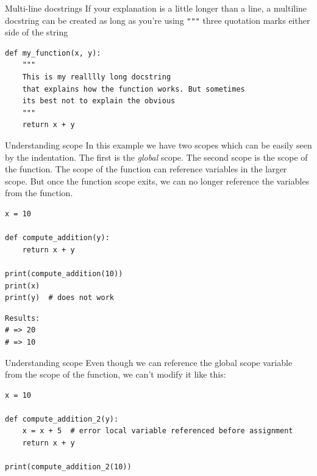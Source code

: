 \documentclass[10pt]{beamer}
\begin{document}
\begin{frame}[label={sec:org1e1bd2d},fragile]{Multi-line docstrings}
 If your explanation is a little longer than a line, a multiline docstring can be
created as long as you're using \texttt{"""} three quotation marks either side of the string

\begin{verbatim}
def my_function(x, y):
    """
    This is my realllly long docstring
    that explains how the function works. But sometimes
    its best not to explain the obvious
    """
    return x + y
\end{verbatim}
\end{frame}

\begin{frame}[label={sec:org802cd09},fragile]{Understanding scope}
 In this example we have two scopes which can be easily seen by the indentation. The
first is the \emph{global} scope. The second scope is the scope of the function. The scope
of the function can reference variables in the larger scope. But once the function
scope exits, we can no longer reference the variables from the function.

\begin{verbatim}
x = 10

def compute_addition(y):
    return x + y

print(compute_addition(10))
print(x)
print(y)  # does not work
\end{verbatim}

\begin{verbatim}
Results: 
# => 20
# => 10
\end{verbatim}
\end{frame}

\begin{frame}[label={sec:orgc70273f},fragile]{Understanding scope}
 Even though we can reference the global scope variable from the scope of the
function, we can't modify it like this:

\begin{verbatim}
x = 10

def compute_addition_2(y):
    x = x + 5  # error local variable referenced before assignment
    return x + y

print(compute_addition_2(10))
\end{verbatim}
\end{frame}
\end{document}
